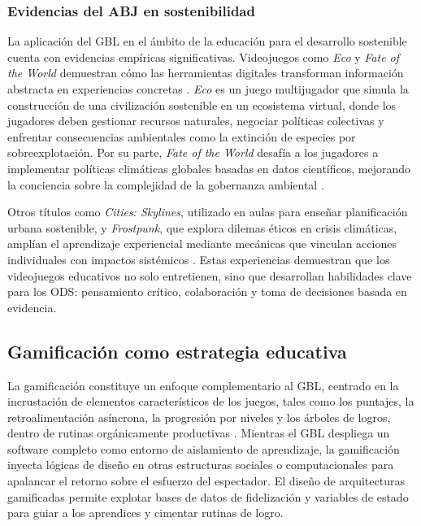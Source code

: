 \subsubsection{Evidencias del ABJ en sostenibilidad}
\label{subsubsec:evidencias_abj}

La aplicación del GBL en el ámbito de la educación para el desarrollo sostenible cuenta con evidencias empíricas significativas. Videojuegos como \textit{Eco} y \textit{Fate of the World} demuestran cómo las herramientas digitales transforman información abstracta en experiencias concretas \parencite{FernandezGaleote2021}. \textit{Eco} es un juego multijugador que simula la construcción de una civilización sostenible en un ecosistema virtual, donde los jugadores deben gestionar recursos naturales, negociar políticas colectivas y enfrentar consecuencias ambientales como la extinción de especies por sobreexplotación. Por su parte, \textit{Fate of the World} desafía a los jugadores a implementar políticas climáticas globales basadas en datos científicos, mejorando la conciencia sobre la complejidad de la gobernanza ambiental \parencite{FloodCradock2024}.

Otros títulos como \textit{Cities: Skylines}, utilizado en aulas para enseñar planificación urbana sostenible, y \textit{Frostpunk}, que explora dilemas éticos en crisis climáticas, amplían el aprendizaje experiencial mediante mecánicas que vinculan acciones individuales con impactos sistémicos \parencite{Hawlitschek2022}. Estas experiencias demuestran que los videojuegos educativos no solo entretienen, sino que desarrollan habilidades clave para los ODS: pensamiento crítico, colaboración y toma de decisiones basada en evidencia.

\subsection{Gamificación como estrategia educativa}
\label{subsec:gamificacion}

La gamificación constituye un enfoque complementario al GBL, centrado en la incrustación de elementos característicos de los juegos, tales como los puntajes, la retroalimentación asíncrona, la progresión por niveles y los árboles de logros, dentro de rutinas orgánicamente productivas \parencite{Mabalay2025}. Mientras el GBL despliega un software completo como entorno de aislamiento de aprendizaje, la gamificación inyecta lógicas de diseño en otras estructuras sociales o computacionales para apalancar el retorno sobre el esfuerzo del espectador. El diseño de arquitecturas gamificadas permite explotar bases de datos de fidelización y variables de estado para guiar a los aprendices y cimentar rutinas de logro.


